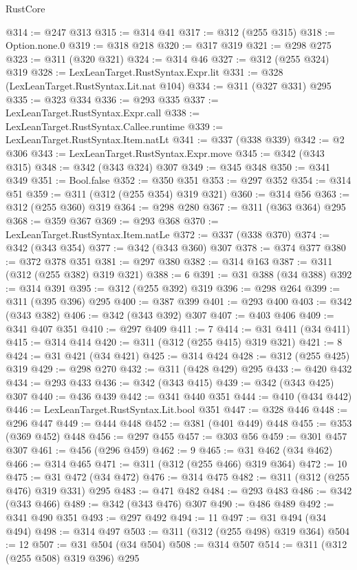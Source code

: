 \begin{lexlean}{RustCore}
\begin{coremodule}
@314 := @247 @313
@315 := @314 @41
@317 := @312 (@255 @315)
@318 := Option.none.{0}
@319 := @318 @218
@320 := @317 @319
@321 := @298 @275
@323 := @311 (@320 @321)
@324 := @314 @46
@327 := @312 (@255 @324) @319
@328 := LexLeanTarget.RustSyntax.Expr.lit
@331 := @328 (LexLeanTarget.RustSyntax.Lit.nat @104)
@334 := @311 (@327 @331) @295
@335 := @323 @334
@336 := @293 @335
@337 := LexLeanTarget.RustSyntax.Expr.call
@338 := LexLeanTarget.RustSyntax.Callee.runtime
@339 := LexLeanTarget.RustSyntax.Item.natLt
@341 := @337 (@338 @339)
@342 := @2 @306
@343 := LexLeanTarget.RustSyntax.Expr.move
@345 := @342 (@343 @315)
@348 := @342 (@343 @324) @307
@349 := @345 @348
@350 := @341 @349
@351 := Bool.false
@352 := @350 @351
@353 := @297 @352
@354 := @314 @51
@359 := @311 (@312 (@255 @354) @319 @321)
@360 := @314 @56
@363 := @312 (@255 @360) @319
@364 := @298 @280
@367 := @311 (@363 @364) @295
@368 := @359 @367
@369 := @293 @368
@370 := LexLeanTarget.RustSyntax.Item.natLe
@372 := @337 (@338 @370)
@374 := @342 (@343 @354)
@377 := @342 (@343 @360) @307
@378 := @374 @377
@380 := @372 @378 @351
@381 := @297 @380
@382 := @314 @163
@387 := @311 (@312 (@255 @382) @319 @321)
@388 := 6
@391 := @31 @388 (@34 @388)
@392 := @314 @391
@395 := @312 (@255 @392) @319
@396 := @298 @264
@399 := @311 (@395 @396) @295
@400 := @387 @399
@401 := @293 @400
@403 := @342 (@343 @382)
@406 := @342 (@343 @392) @307
@407 := @403 @406
@409 := @341 @407 @351
@410 := @297 @409
@411 := 7
@414 := @31 @411 (@34 @411)
@415 := @314 @414
@420 := @311 (@312 (@255 @415) @319 @321)
@421 := 8
@424 := @31 @421 (@34 @421)
@425 := @314 @424
@428 := @312 (@255 @425) @319
@429 := @298 @270
@432 := @311 (@428 @429) @295
@433 := @420 @432
@434 := @293 @433
@436 := @342 (@343 @415)
@439 := @342 (@343 @425) @307
@440 := @436 @439
@442 := @341 @440 @351
@444 := @410 (@434 @442)
@446 := LexLeanTarget.RustSyntax.Lit.bool @351
@447 := @328 @446
@448 := @296 @447
@449 := @444 @448
@452 := @381 (@401 @449) @448
@455 := @353 (@369 @452) @448
@456 := @297 @455
@457 := @303 @56
@459 := @301 @457 @307
@461 := @456 (@296 @459)
@462 := 9
@465 := @31 @462 (@34 @462)
@466 := @314 @465
@471 := @311 (@312 (@255 @466) @319 @364)
@472 := 10
@475 := @31 @472 (@34 @472)
@476 := @314 @475
@482 := @311 (@312 (@255 @476) @319 @331) @295
@483 := @471 @482
@484 := @293 @483
@486 := @342 (@343 @466)
@489 := @342 (@343 @476) @307
@490 := @486 @489
@492 := @341 @490 @351
@493 := @297 @492
@494 := 11
@497 := @31 @494 (@34 @494)
@498 := @314 @497
@503 := @311 (@312 (@255 @498) @319 @364)
@504 := 12
@507 := @31 @504 (@34 @504)
@508 := @314 @507
@514 := @311 (@312 (@255 @508) @319 @396) @295

\end{coremodule}
\end{lexlean}
